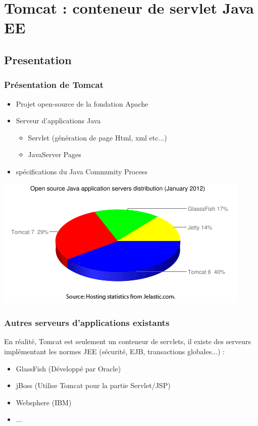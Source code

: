 \section{Tomcat : conteneur de servlet Java EE}
\subsection{Presentation}
\begin{frame}
  \frametitle{Présentation de Tomcat}

  \begin{itemize}
    \item Projet open-source de la fondation Apache
    \item Serveur d'applications Java
    \begin{itemize}
      \item Servlet (génération de page Html, xml etc...)
      \item JavaServer Pages
    \end{itemize}
    \item spécifications du Java Community Process
  \end{itemize}
  \includegraphics[scale=0.5]{Images/marcheJEE.png}
\end{frame}

\begin{frame}
  \frametitle{Autres serveurs d'applications existants}
En réalité, Tomcat est seulement un conteneur de servlets, il existe des serveurs implémentant les normes JEE (sécurité, EJB, transactions globales...) :
\begin{itemize} 
  \item GlassFish (Développé par Oracle)
  \item jBoss (Utilise Tomcat pour la partie Servlet/JSP)
  \item Websphere (IBM)
  \item ...
\end{itemize}
\end{frame}

